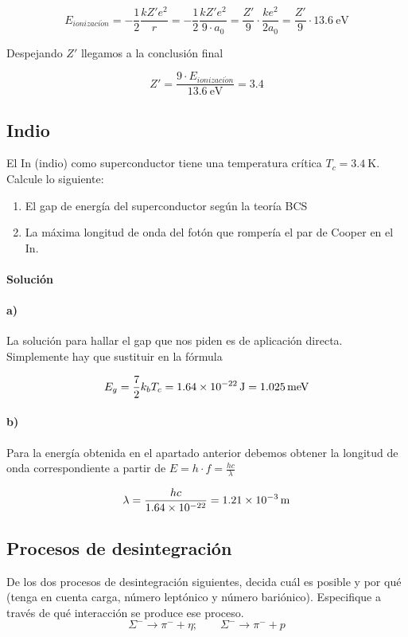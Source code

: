 \documentclass[12pt, a4paper]{article}
\begin{document}
    $$E_{ionizaci\acute{o}n}=-\frac{1}{2}\frac{kZ'e^2}{r} = -\frac{1}{2}\frac{k Z' e^2}{9 \cdot a_0} = \frac{Z'}{9}\cdot \frac{k e^2}{2 a_0}=
    \frac{Z'}{9}\cdot \SI{13.6}{\electronvolt}$$



    Despejando $Z'$ llegamos a la conclusión final

    $$Z'=\frac{9 \cdot E_{ionizaci\acute{o}n}}{\SI{13.6}{\electronvolt}} = \num{3.4}$$

    \subsection{Indio}
    El In (indio) como superconductor tiene una temperatura crítica ${T_c=\SI{3.4}{\kelvin}}$. Calcule
    lo siguiente:
    \begin{enumerate}[label=\alph*)]
        \item El gap de energía del superconductor según la teoría BCS
        \item La máxima longitud de onda del fotón que rompería el par de Cooper en el In.
    \end{enumerate}

    \paragraph{\textbf{Solución}}
    \paragraph{a)} La solución para hallar el gap que nos piden es de aplicación directa. Simplemente hay
    que sustituir en la fórmula

    $$E_g=\frac{7}{2} k_b T_c = \SI{1.64d-22}{\J} = \SI{1.025}{\milli\electronvolt}$$

    \paragraph{b)} Para la energía obtenida en el apartado anterior debemos obtener la longitud
    de onda correspondiente a partir de $E=h\cdot f = \frac{h c}{\lambda}$

    $$\lambda = \frac{h c}{\num{1.64d-22}} = \SI{1.21d-3}{\meter}$$




    \subsection{Procesos de desintegración}
    De los dos procesos de desintegración siguientes, decida cuál es posible y por qué
    (tenga en cuenta carga, número leptónico y número bariónico). Especifique a través
    de qué interacción se produce ese proceso.
    $$\Sigma^{-} \rightarrow \pi^{-} + \eta;   \quad \quad \Sigma^{-} \rightarrow \pi^{-} + p$$
\end{document}
